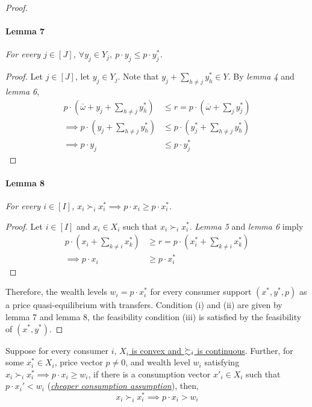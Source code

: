 \documentclass{report}
\begin{document}
\begin{proof}
			\paragraph{Lemma 7} \emph{For every $j \in [J]$, $\forall y_j \in Y_j,\ p \cdot y_j \leq p \cdot y_j^*$.}
			\begin{proof}
				Let $j \in [J]$, let $y_j \in Y_j$. Note that $y_j + \sum_{h \neq j} y_h^* \in Y$. By \emph{lemma 4} and \emph{lemma 6},
				\begin{align}
					p \cdot \left (\overline{\omega} + y_j + \sum_{h \neq j} y_h^* \right ) &\leq r = p \cdot \left ( \overline{\omega} + \sum_{j} y_j^* \right ) \\
					\implies p \cdot \left (y_j + \sum_{h \neq j} y_h^* \right ) &\leq p \cdot \left (y_j^* + \sum_{h \neq j} y_h^* \right ) \\
					\implies p \cdot y_j &\leq p \cdot y_j^*
				\end{align}
			\end{proof}
			\paragraph{Lemma 8} \emph{For every $i \in [I]$, $x_i \succ_i x_i^* \implies p \cdot x_i \geq p \cdot x_i^*$.}
			\begin{proof}
				Let $i \in [I]$ and $x_i \in X_i$ such that $x_i \succ_i x_i^*$. \emph{Lemma 5} and \emph{lemma 6} imply
				\begin{align}
					p \cdot \left (x_i + \sum_{k \neq i} x_k^* \right ) &\geq r = p \cdot \left (x_i^* + \sum_{k \neq i} x_k^* \right ) \\
					\implies p \cdot x_i &\geq p \cdot x_i^*
				\end{align}
			\end{proof}
			Therefore, the wealth levels $w_i = p \cdot x_i^*$ for every consumer support $(x^*, y^*, p)$ as a price quasi-equilibrium with transfers. Condition (i) and (ii) are given by lemma 7 and lemma 8, the feasibility condition (iii) is satisfied by the feasibility of $(x^*, y^*)$.
		\end{proof}
		
		\begin{proposition}
			Suppose for every consumer $i$, \ul{$X_i$ is convex and $\succsim_i$ is continuous}. Further, for some $x_i^* \in X_i$, price vector $p \neq 0$, and wealth level $w_i$ satisfying $x_i \succ_i x_i^* \implies p \cdot x_i \geq w_i$, if there is a consumption vector $x'_i \in X_i$ such that $p \cdot x_i' < w_i$ (\ul{\emph{cheaper consumption assumption}}), then, 
			\begin{equation}
				x_i \succ_i x_i^* \implies p \cdot x_i > w_i
			\end{equation}
		\end{proposition}
		
\end{document}
